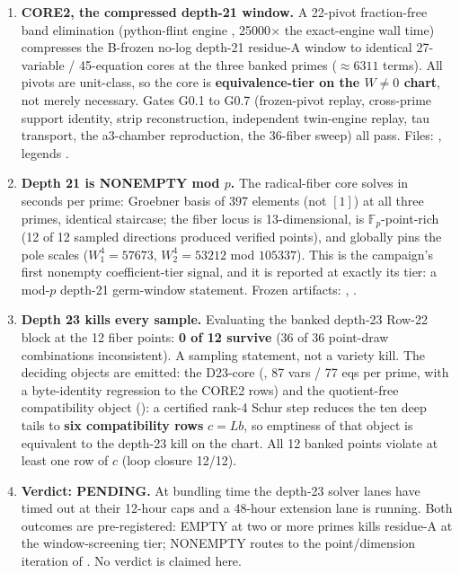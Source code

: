 \documentclass[11pt]{article}
\theoremstyle{definition}
\theoremstyle{remark}
\begin{document}
\begin{enumerate}
\item \textbf{CORE2, the compressed depth-21 window.} A 22-pivot
fraction-free band elimination (python-flint engine ,
25000$\times$ the exact-engine wall time) compresses the B-frozen no-log
depth-21 residue-A window to identical 27-variable / 45-equation cores at
the three banked primes ($\approx 6311$ terms). All pivots are unit-class,
so the core is \textbf{equivalence-tier on the $W\neq 0$ chart}, not merely
necessary. Gates G0.1 to G0.7 (frozen-pivot replay, cross-prime support
identity, strip reconstruction, independent twin-engine replay, tau
transport, the a3-chamber reproduction, the 36-fiber sweep) all pass.
Files: , legends .
\item \textbf{Depth 21 is NONEMPTY mod $p$.} The radical-fiber core solves
in seconds per prime: Groebner basis of 397 elements (not $[1]$) at all
three primes, identical staircase; the fiber locus is 13-dimensional, is
$\mathbb{F}_p$-point-rich (12 of 12 sampled directions produced verified
points), and globally pins the pole scales ($W_1^4=57673$, $W_2^4=53212$
mod $105337$). This is the campaign's first nonempty coefficient-tier
signal, and it is reported at exactly its tier: a mod-$p$ depth-21
germ-window statement. Frozen artifacts:
,
.
\item \textbf{Depth 23 kills every sample.} Evaluating the banked depth-23
Row-22 block at the 12 fiber points: \textbf{0 of 12 survive} (36 of 36
point-draw combinations inconsistent). A sampling statement, not a variety
kill. The deciding objects are emitted: the D23-core
(, 87 vars / 77 eqs per prime, with a
byte-identity regression to the CORE2 rows) and the quotient-free
compatibility object (): a certified
rank-4 Schur step reduces the ten deep tails to \textbf{six compatibility
rows} $c=Lb$, so emptiness of that object is equivalent to the depth-23
kill on the chart. All 12 banked points violate at least one row of $c$
(loop closure 12/12).
\item \textbf{Verdict: PENDING.} At bundling time the depth-23 solver lanes
have timed out at their 12-hour caps and a 48-hour extension lane is
running. Both outcomes are
pre-registered: EMPTY at two or more primes kills residue-A at the
window-screening tier; NONEMPTY routes to the point/dimension iteration of
. No verdict is claimed here.
\end{enumerate}
\end{document}
